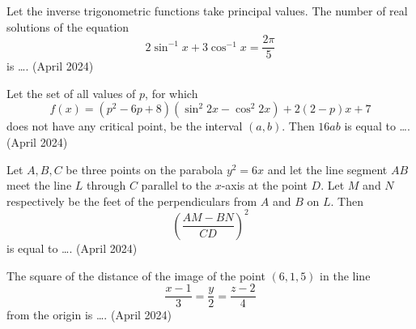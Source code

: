 \item Let the inverse trigonometric functions take principal values. The number of real solutions of the equation 
\begin{equation*}
2\sin^{-1} x + 3\cos^{-1} x = \frac{2\pi}{5}
\end{equation*}
is \dots.
\hfill{(April 2024)}
\item Let the set of all values of $p$, for which 
\begin{equation*}
f(x) = (p^2 - 6p + 8)(\sin^2 2x - \cos^2 2x) + 2(2 - p)x + 7
\end{equation*}
does not have any critical point, be the interval $(a, b)$. Then $16ab$ is equal to \dots.
\hfill{(April 2024)}
\item Let $A, B, C$ be three points on the parabola $y^2 = 6x$ and let the line segment $AB$ meet the line $L$ through $C$ parallel to the $x$-axis at the point $D$. Let $M$ and $N$ respectively be the feet of the perpendiculars from $A$ and $B$ on $L$. Then 
\begin{equation*}
\left(\frac{AM - BN}{CD}\right)^2
\end{equation*}
is equal to \dots.
\hfill{(April 2024)}
\item The square of the distance of the image of the point $(6, 1, 5)$ in the line 
\begin{equation*}
\frac{x - 1}{3} = \frac{y}{2} = \frac{z - 2}{4}
\end{equation*}
from the origin is \dots.
\hfill{(April 2024)}

%


